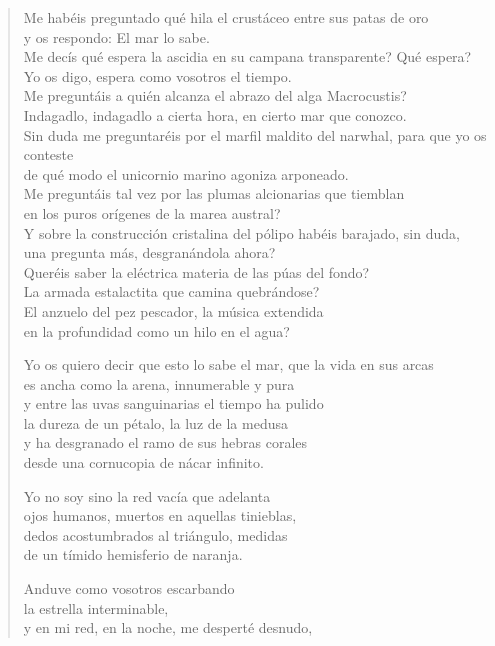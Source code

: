 \documentclass[12pt]{article}
\begin{document}
\clearpage
{}
\begin{verse}

Me habéis preguntado qué hila el crustáceo entre sus patas de oro\\
y os respondo: El mar lo sabe.\\
Me decís qué espera la ascidia en su campana transparente? Qué espera?\\
Yo os digo, espera como vosotros el tiempo.\\
Me preguntáis a quién alcanza el abrazo del alga Macrocustis?\\
Indagadlo, indagadlo a cierta hora, en cierto mar que conozco.\\
Sin duda me preguntaréis por el marfil maldito del narwhal, para que yo os conteste\\
de qué modo el unicornio marino agoniza arponeado.\\
Me preguntáis tal vez por las plumas alcionarias que tiemblan\\
en los puros orígenes de la marea austral?\\
Y sobre la construcción cristalina del pólipo habéis barajado, sin duda,\\
una pregunta más, desgranándola ahora?\\
Queréis saber la eléctrica materia de las púas del fondo?\\
La armada estalactita que camina quebrándose?\\
El anzuelo del pez pescador, la música extendida\\
en la profundidad como un hilo en el agua?  

Yo os quiero decir que esto lo sabe el mar, que la vida en sus arcas\\
es ancha como la arena, innumerable y pura\\
y entre las uvas sanguinarias el tiempo ha pulido\\
la dureza de un pétalo, la luz de la medusa\\
y ha desgranado el ramo de sus hebras corales\\
desde una cornucopia de nácar infinito.  

Yo no soy sino la red vacía que adelanta\\
ojos humanos, muertos en aquellas tinieblas,\\
dedos acostumbrados al triángulo, medidas\\
de un tímido hemisferio de naranja.  

Anduve como vosotros escarbando\\
la estrella interminable,\\
y en mi red, en la noche, me desperté desnudo,  

\end{verse}
\end{document}

